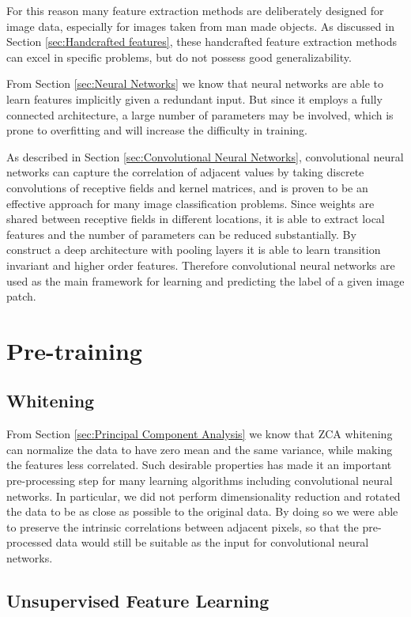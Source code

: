 For this reason many feature extraction methods are deliberately designed for image data, especially for images taken from man made objects. As discussed in Section \ref{sec:Handcrafted features}, these handcrafted feature extraction methods can excel in specific problems, but do not possess good generalizability.

From Section \ref{sec:Neural Networks} we know that neural networks are able to learn features implicitly given a redundant input. But since it employs a fully connected architecture, a large number of parameters may be involved, which is prone to overfitting and will increase the difficulty in training.

As described in Section \ref{sec:Convolutional Neural Networks}, convolutional neural networks can capture the correlation of adjacent values by taking discrete convolutions of receptive fields and kernel matrices, and is proven to be an effective approach for many image classification problems. Since weights are shared between receptive fields in different locations, it is able to extract local features and the number of parameters can be reduced substantially. By construct a deep architecture with pooling layers it is able to learn transition invariant and higher order features. Therefore convolutional neural networks are used as the main framework for learning and predicting the label of a given image patch. 

\section{Pre-training}
\subsection{Whitening}
\label{sec:Whitening}
From Section \ref{sec:Principal Component Analysis} we know that ZCA whitening can normalize the data to have zero mean and the same variance, while making the features less correlated. Such desirable properties has made it an important pre-processing step for many learning algorithms including convolutional neural networks. In particular, we did not perform dimensionality reduction and rotated the data to be as close as possible to the original data. By doing so we were able to preserve the intrinsic correlations between adjacent pixels, so that the pre-processed data would still be suitable as the input for convolutional neural networks.

\subsection{Unsupervised Feature Learning}
\label{sec:Unsupervised Feature Learning}

